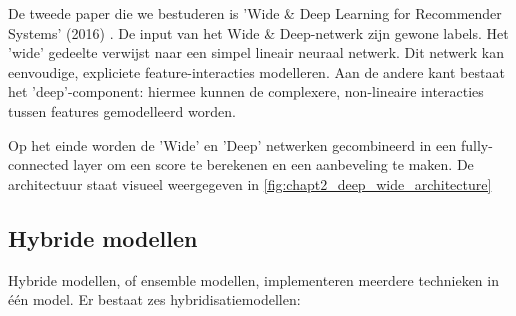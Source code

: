 
De tweede paper die we bestuderen is 'Wide \& Deep Learning for Recommender Systems' (2016) \cite{wide_deep_learning_paper}. De input van het Wide \& Deep-netwerk zijn gewone labels. Het 'wide' gedeelte verwijst naar een simpel lineair neuraal netwerk. Dit netwerk kan eenvoudige, expliciete feature-interacties modelleren. Aan de andere kant bestaat het 'deep'-component: hiermee kunnen de complexere, non-lineaire interacties tussen features gemodelleerd worden. 

Op het einde worden de 'Wide' en 'Deep' netwerken gecombineerd in een fully-connected layer om een score te berekenen en een aanbeveling te maken. De architectuur staat visueel weergegeven in \autoref{fig:chapt2_deep_wide_architecture}


\subsection{Hybride modellen}

Hybride modellen, of ensemble modellen, implementeren meerdere technieken in één model. Er bestaat zes hybridisatiemodellen:

